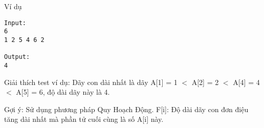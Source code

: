 Ví dụ
\begin{verbatim}
Input:
6
1 2 5 4 6 2 

Output:
4
\end{verbatim}

       Giải thích test ví dụ:      Dãy con dài nhất là dãy A[1] = 1 $<$ A[2] = 2 $<$ A[4] = 4 $<$ A[5] = 6, độ dài dãy này là 4.  

       Gợi ý:      Sử dụng phương pháp Quy Hoạch Động. F[i]: Độ dài dãy con đơn điệu tăng dài nhất mà phần tử cuối cùng là số A[i] này.